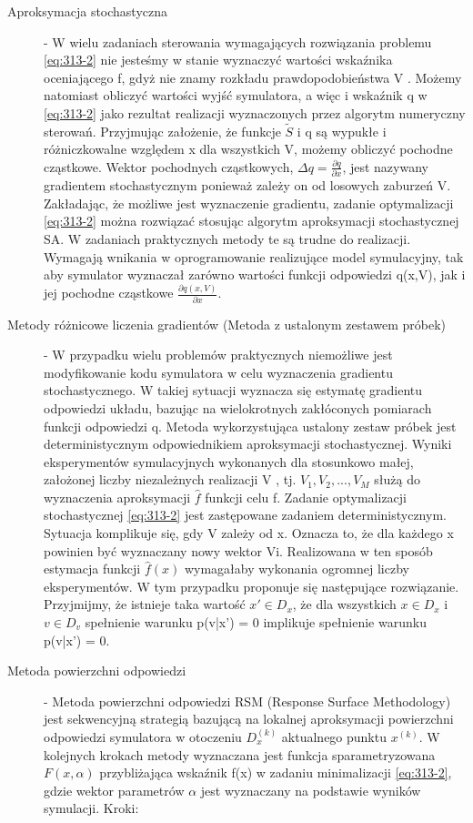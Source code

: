 \begin{description}
    \item[Aproksymacja stochastyczna] - W wielu zadaniach sterowania wymagających rozwiązania problemu \eqref{eq:313-2} nie jesteśmy w stanie wyznaczyć wartości wskaźnika oceniającego f, gdyż nie znamy rozkładu prawdopodobieństwa V . Możemy natomiast obliczyć wartości wyjść symulatora, a więc i wskaźnik q w \eqref{eq:313-2} jako rezultat realizacji wyznaczonych przez algorytm numeryczny sterowań. Przyjmując założenie, że funkcje $\tilde{S}$ i q są wypukłe i różniczkowalne względem x dla wszystkich V, możemy obliczyć pochodne cząstkowe. Wektor pochodnych cząstkowych, $\Delta q = \frac{\partial q}{\partial x}$, jest nazywany gradientem stochastycznym ponieważ zależy on od losowych zaburzeń V. Zakładając, że możliwe jest wyznaczenie gradientu, zadanie optymalizacji \eqref{eq:313-2} można rozwiązać stosując algorytm aproksymacji stochastycznej SA. W zadaniach praktycznych metody te są trudne do realizacji. Wymagają wnikania w oprogramowanie realizujące model symulacyjny, tak aby symulator wyznaczał zarówno wartości funkcji odpowiedzi q(x,V), jak i jej pochodne cząstkowe $\frac{\partial q(x,V)}{\partial x}$.
    \item[Metody różnicowe liczenia gradientów (Metoda z ustalonym zestawem próbek)] - W przypadku wielu problemów praktycznych niemożliwe jest modyfikowanie kodu symulatora w celu wyznaczenia gradientu stochastycznego. W takiej sytuacji wyznacza się estymatę gradientu odpowiedzi układu, bazując na wielokrotnych zakłóconych pomiarach funkcji odpowiedzi q. Metoda wykorzystująca ustalony zestaw próbek jest deterministycznym odpowiednikiem aproksymacji stochastycznej. Wyniki eksperymentów symulacyjnych wykonanych dla stosunkowo małej, założonej liczby niezależnych realizacji V , tj. $V_1, V_2, ..., V_M$ służą do wyznaczenia aproksymacji $\hat{f}$ funkcji celu f. Zadanie optymalizacji stochastycznej \eqref{eq:313-2} jest zastępowane zadaniem deterministycznym. Sytuacja komplikuje się, gdy V zależy od x. Oznacza to, że dla każdego x powinien być wyznaczany nowy wektor Vi. Realizowana w ten sposób estymacja funkcji $\hat{f}(x)$ wymagałaby wykonania ogromnej liczby eksperymentów. W tym przypadku proponuje się następujące rozwiązanie. Przyjmijmy, że istnieje taka wartość $x' \in D_x$, że dla wszystkich $x\in D_x$ i $v\in D_v$ spełnienie warunku p(v|x') = 0 implikuje spełnienie warunku p(v|x') = 0.
    \item[Metoda powierzchni odpowiedzi] - Metoda powierzchni odpowiedzi RSM (Response Surface Methodology) jest sekwencyjną strategią bazującą na lokalnej aproksymacji powierzchni odpowiedzi symulatora w otoczeniu $D_x^{(k)}$ aktualnego punktu $x^{(k)}$. W kolejnych krokach metody wyznaczana jest funkcja sparametryzowana $F(x,\alpha)$ przybliżająca wskaźnik f(x) w zadaniu minimalizacji \eqref{eq:313-2}, gdzie wektor parametrów $\alpha$ jest wyznaczany na podstawie wyników symulacji. Kroki:\mbox{}

\end{description}
